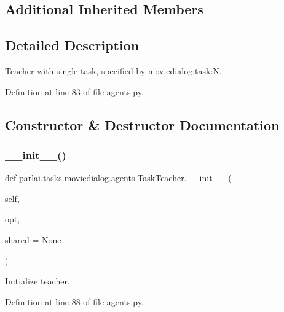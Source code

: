 \subsection*{Additional Inherited Members}


\subsection{Detailed Description}
\begin{DoxyVerb}Teacher with single task, specified by moviedialog:task:N.
\end{DoxyVerb}
 

Definition at line 83 of file agents.\+py.



\subsection{Constructor \& Destructor Documentation}
\mbox{\label{classparlai_1_1tasks_1_1moviedialog_1_1agents_1_1TaskTeacher_a3cc846c9e289de305215cc30b6e1f1b0}} 
\subsubsection{\texorpdfstring{\+\_\+\+\_\+init\+\_\+\+\_\+()}{\_\_init\_\_()}}
{\footnotesize\ttfamily def parlai.\+tasks.\+moviedialog.\+agents.\+Task\+Teacher.\+\_\+\+\_\+init\+\_\+\+\_\+ (\begin{DoxyParamCaption}\item[{}]{self,  }\item[{}]{opt,  }\item[{}]{shared = {\ttfamily None} }\end{DoxyParamCaption})}

\begin{DoxyVerb}Initialize teacher.
\end{DoxyVerb}
 

Definition at line 88 of file agents.\+py.


